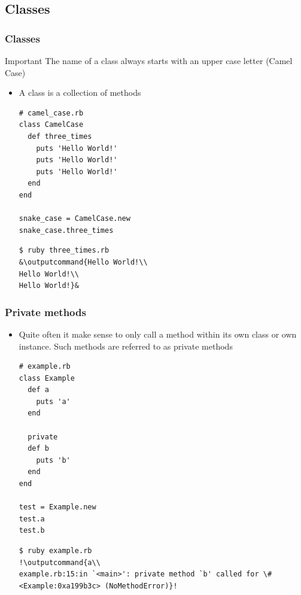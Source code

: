 \documentclass{beamer}
\newcommand{\outputcommand}[1]{\color{darkgreen}{#1}}
\begin{document}
\subsection{Classes}
\begin{frame}
\frametitle{Classes}
\begin{block}{Important}
\alert{The name of a class always starts with an upper case letter (Camel Case)}
\end{block}
\begin{itemize}
\item A class is a collection of methods

\lstset{language=Ruby, style=eclipse}
\begin{lstlisting}[escapechar=&]
# camel_case.rb
class CamelCase
  def three_times
    puts 'Hello World!'
    puts 'Hello World!'
    puts 'Hello World!'
  end
end

snake_case = CamelCase.new
snake_case.three_times
\end{lstlisting}

\lstset{language=shell}
\begin{lstlisting}[numbers=none, escapechar=&]
$ ruby three_times.rb
&\outputcommand{Hello World!\\
Hello World!\\
Hello World!}&
\end{lstlisting}

\end{itemize}
\end{frame}
\begin{frame}
\frametitle{Private methods}
\begin{itemize}
\item Quite often it make sense to only call a method within its own class or own instance.
Such methods are referred to as private methods

\lstset{language=Ruby, style=eclipse}
\begin{lstlisting}[escapechar=&]
# example.rb
class Example
  def a
    puts 'a'
  end

  private
  def b
    puts 'b'
  end
end

test = Example.new
test.a
test.b
\end{lstlisting}

\lstset{language=shell}
\begin{lstlisting}[numbers=none, escapechar=!]
$ ruby example.rb
!\outputcommand{a\\
example.rb:15:in `<main>': private method `b' called for \#<Example:0xa199b3c> (NoMethodError)}!
\end{lstlisting}
\end{itemize}
\end{frame}
\end{document}
